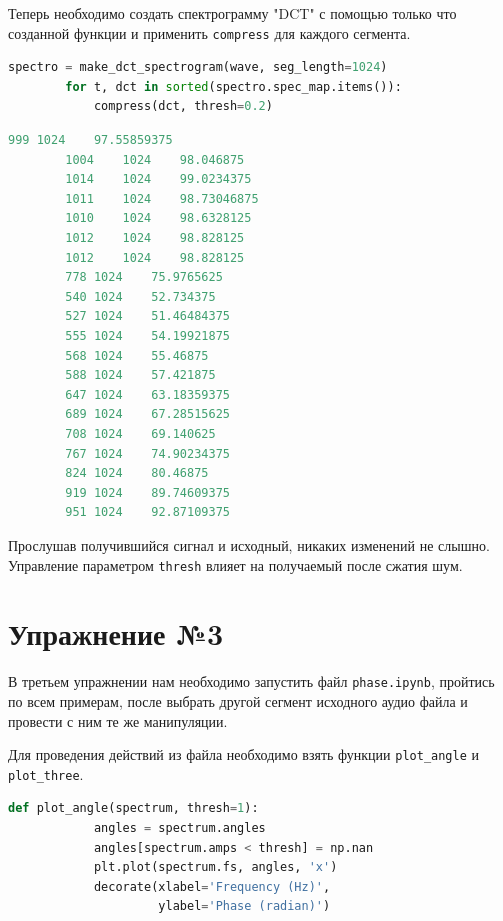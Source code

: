 \documentclass[a4paper, 14pt]{extarticle}
\begin{document}
    Теперь необходимо создать спектрограмму "DCT" с помощью только что созданной функции и применить \texttt{compress} для каждого сегмента.

    \begin{lstlisting}[language=Python, caption= Применение "DCT" для всего файла, label={lst:dct_to_spectrogram}]
        spectro = make_dct_spectrogram(wave, seg_length=1024)
        for t, dct in sorted(spectro.spec_map.items()):
            compress(dct, thresh=0.2)
    \end{lstlisting}

    \begin{lstlisting}[language=Python, caption= Пример вывода функции label={lst:example_output}]
        999	1024	97.55859375
        1004	1024	98.046875
        1014	1024	99.0234375
        1011	1024	98.73046875
        1010	1024	98.6328125
        1012	1024	98.828125
        1012	1024	98.828125
        778	1024	75.9765625
        540	1024	52.734375
        527	1024	51.46484375
        555	1024	54.19921875
        568	1024	55.46875
        588	1024	57.421875
        647	1024	63.18359375
        689	1024	67.28515625
        708	1024	69.140625
        767	1024	74.90234375
        824	1024	80.46875
        919	1024	89.74609375
        951	1024	92.87109375
    \end{lstlisting}

    Прослушав получившийся сигнал и исходный, никаких изменений не слышно.
    Управление параметром \texttt{thresh} влияет на получаемый после сжатия шум.

    \newpage


    \section{Упражнение №3}
    \label{sec:3}

    В третьем упражнении нам необходимо запустить файл \texttt{phase.ipynb}, пройтись по всем примерам, после выбрать другой сегмент исходного аудио файла и провести с ним те же манипуляции.

    Для проведения действий из файла необходимо взять функции \texttt{plot\_angle} и \texttt{plot\_three}.

    \begin{lstlisting}[language=Python, caption= Функция plot\_angle, label={lst:plot_angle}]
        def plot_angle(spectrum, thresh=1):
            angles = spectrum.angles
            angles[spectrum.amps < thresh] = np.nan
            plt.plot(spectrum.fs, angles, 'x')
            decorate(xlabel='Frequency (Hz)',
                     ylabel='Phase (radian)')
    \end{lstlisting}
\end{document}
